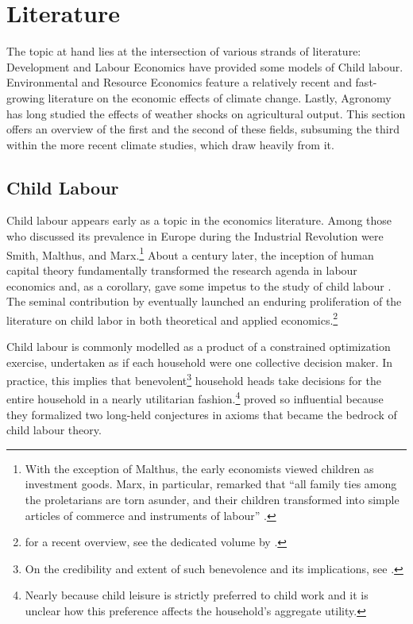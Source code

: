 \documentclass[a4paper,12pt]{article}
\theoremstyle{plain}
\theoremstyle{definition}
\theoremstyle{definition}
\theoremstyle{definition}
\theoremstyle{definition}
\begin{document}
\section{Literature}
\label{sec:literature}
The topic at hand lies at the intersection of various strands of literature: Development and Labour Economics have provided some models of Child labour. Environmental and Resource Economics feature a relatively recent and fast-growing literature on the economic effects of climate change. Lastly, Agronomy has long studied the effects of weather shocks on agricultural output. This section offers an overview of the first and the second of these fields, subsuming the third within the more recent climate studies, which draw heavily from it.

\subsection{Child Labour}
\label{sub:child_labour}
Child labour appears early as a topic in the economics literature. Among those who discussed its prevalence in Europe during the Industrial Revolution were Smith, Malthus, and Marx.\footnote{With the exception of Malthus, the early economists viewed children as investment goods. Marx, in particular, remarked that ``all family ties among the proletarians are torn asunder, and their children transformed into simple articles of commerce and instruments of labour'' \citep{Marx1848}.} About a century later, the inception of human capital theory \citep{Mincer1958, Schultz1961, Becker1964} fundamentally transformed the research agenda in labour economics and, as a corollary, gave some impetus to the study of child labour \citep[see e.g.][]{Rosenzweig1977}. The seminal contribution by \citet{Basu1998} eventually launched an enduring proliferation of the literature on child labor \citep{Edmonds2007} in both  theoretical and applied economics.\footnote{for a recent overview, see the dedicated volume by \citet{Posso2020}.}

Child labour is commonly modelled as a product of a constrained optimization exercise, undertaken as if each household were one collective decision maker. In practice, this implies that benevolent\footnote{On the credibility and extent of such benevolence and its implications, see \citet{Bhalotra2002}.} household heads take decisions for the entire household in a nearly utilitarian fashion.\footnote{Nearly because child leisure is strictly preferred to child work and it is unclear how this preference affects the household's aggregate utility.} \citet{Basu1998} proved so influential because they formalized two long-held conjectures in axioms that became the bedrock of child labour theory.
\end{document}
